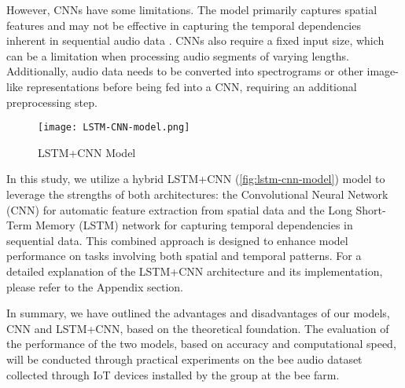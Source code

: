 However, CNNs have some limitations. The model primarily captures spatial features and may
not be effective in capturing the temporal dependencies inherent in sequential
audio data \cite{lim2020time}. CNNs also require a fixed input size, which can be a limitation when
processing audio segments of varying lengths. Additionally, audio data needs to be
converted into spectrograms or other image-like representations before being fed into a CNN,
requiring an additional preprocessing step.

\vspace{-1em}
\begin{figure}[H]
    \centering
    \texttt{[image: LSTM-CNN-model.png]}
    \caption{LSTM+CNN Model}
    \label{fig:lstm-cnn-model}
\end{figure}
\vspace{-1em}

In this study, we utilize a hybrid LSTM+CNN (\autoref{fig:lstm-cnn-model}) 
model to leverage the strengths of both architectures: the Convolutional Neural Network (CNN) 
for automatic feature extraction from spatial data and the Long Short-Term Memory (LSTM) 
network for capturing temporal dependencies in sequential data. This combined approach is 
designed to enhance model performance on tasks involving both spatial and temporal patterns. 
For a detailed explanation of the LSTM+CNN architecture and its implementation, please refer 
to the Appendix section.

In summary, we have outlined the advantages and disadvantages of our
models, CNN and LSTM+CNN, based on the theoretical foundation. The
evaluation of the performance of the two models, based on accuracy and
computational speed, will be conducted through practical experiments
on the bee audio dataset collected through IoT devices installed by
the group at the bee farm.
